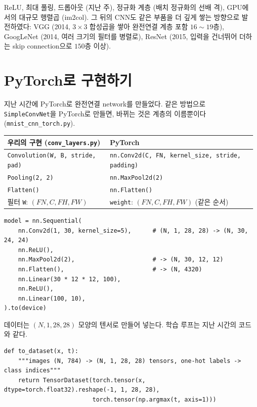\documentclass[11pt,a4paper]{article}
\begin{document}
\begin{keybox}
ReLU, 최대 풀링, 드롭아웃 (지난 주), 정규화 계층 (배치 정규화의 선배 격), GPU에서의 대규모 행렬곱 (im2col).
그 뒤의 CNN도 같은 부품을 더 깊게 쌓는 방향으로 발전하였다:
VGG (2014, $3\times3$ 합성곱을 쌓아 완전연결 계층 포함 $16\sim19$층), GoogLeNet (2014, 여러 크기의 필터를 병렬로),
ResNet (2015, 입력을 건너뛰어 더하는 skip connection으로 $150$층 이상).
\end{keybox}

\section{PyTorch로 구현하기}\label{sec:torchcnn}

지난 시간에 PyTorch로 완전연결 network를 만들었다.
같은 방법으로 \texttt{SimpleConvNet}을 PyTorch로 만들면, 바뀌는 것은 계층의 이름뿐이다
(\texttt{mnist\_cnn\_torch.py}).
\begin{center}
\begin{tabular}{@{}ll@{}}
\toprule
우리의 구현 (\texttt{conv\_layers.py}) & PyTorch \\
\midrule
\texttt{Convolution(W, B, stride, pad)} & \texttt{nn.Conv2d(C, FN, kernel\_size, stride, padding)} \\
\texttt{Pooling(2, 2)} & \texttt{nn.MaxPool2d(2)} \\
\texttt{Flatten()} & \texttt{nn.Flatten()} \\
필터 \texttt{W}: $(FN,C,FH,FW)$ & \texttt{weight}: $(FN,C,FH,FW)$ (같은 순서) \\
\bottomrule
\end{tabular}
\end{center}
\begin{lstlisting}
model = nn.Sequential(
    nn.Conv2d(1, 30, kernel_size=5),      # (N, 1, 28, 28) -> (N, 30, 24, 24)
    nn.ReLU(),
    nn.MaxPool2d(2),                      # -> (N, 30, 12, 12)
    nn.Flatten(),                         # -> (N, 4320)
    nn.Linear(30 * 12 * 12, 100),
    nn.ReLU(),
    nn.Linear(100, 10),
).to(device)
\end{lstlisting}
데이터는 $(N,1,28,28)$ 모양의 텐서로 만들어 넣는다. 학습 루프는 지난 시간의 코드와 같다.
\begin{lstlisting}
def to_dataset(x, t):
    """images (N, 784) -> (N, 1, 28, 28) tensors, one-hot labels -> class indices"""
    return TensorDataset(torch.tensor(x, dtype=torch.float32).reshape(-1, 1, 28, 28),
                         torch.tensor(np.argmax(t, axis=1)))
\end{lstlisting}
\end{document}
